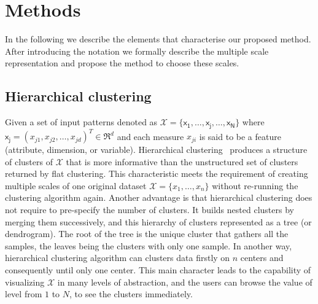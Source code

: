 \section{Methods}
\label{sec:methods}
In the following we describe the elements that characterise our
proposed method. After introducing the notation we formally describe
the multiple scale representation and propose the method to choose these scales.

\subsection{Hierarchical clustering}
\label{subsec:hierarchical}
Given a set of input patterns denoted as $\mathcal{X} = \{\mathsf{x_1}, \ldots, \mathsf{x_j}, \ldots, \mathsf{x_N}\}$ where $\mathsf{x_j} = (x_{j1},x_{j2}, \ldots,x_{jd})^T \in \mathfrak{R}^d$ and each measure $x_{ji}$ is said to be a feature (attribute, dimension, or variable). Hierarchical clustering~\cite{johnson1967hierarchical} produces a structure of clusters of $\mathcal{X}$ that is more informative than the unstructured set of clusters returned by flat clustering. 
This characteristic meets the requirement of creating multiple scales of one original dataset $\mathcal{X}=\{x_1, \ldots, x_n\}$ 
without re-running the clustering algorithm again. Another advantage is that hierarchical clustering does not require to pre-specify the number of clusters. It builds nested clusters by merging them successively, and this hierarchy of clusters represented as a tree (or dendrogram). The root of the tree is the unique cluster that gathers all the samples, the leaves being the clusters with only one sample. In another way, hierarchical clustering algorithm %
can clusters data firstly on $n$ centers and consequently until only one center. This main character leads to the capability of visualizing $\mathcal{X}$ in many levels of abstraction, and the users can browse the value of level from $1$ to $N$, to see the clusters immediately.


